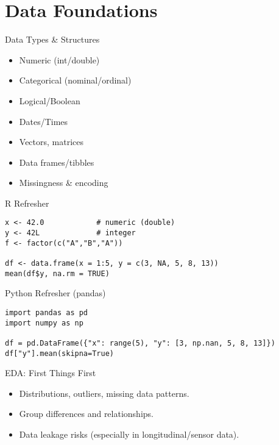 \documentclass[aspectratio=169]{beamer}
\begin{document}
\section{Data Foundations}

\begin{frame}{Data Types \& Structures}
\begin{multicols}{2}
\begin{itemize}
  \item Numeric (int/double)
  \item Categorical (nominal/ordinal)
  \item Logical/Boolean
  \item Dates/Times
\end{itemize}
\columnbreak
\begin{itemize}
  \item Vectors, matrices
  \item Data frames/tibbles
  \item Missingness \& encoding
\end{itemize}
\end{multicols}
\end{frame}

\begin{frame}[fragile]{R Refresher}
\begin{lstlisting}[style=rcode]
x <- 42.0            # numeric (double)
y <- 42L             # integer
f <- factor(c("A","B","A"))

df <- data.frame(x = 1:5, y = c(3, NA, 5, 8, 13))
mean(df$y, na.rm = TRUE)
\end{lstlisting}
\end{frame}

\begin{frame}[fragile]{Python Refresher (pandas)}
\begin{lstlisting}[style=pycode]
import pandas as pd
import numpy as np

df = pd.DataFrame({"x": range(5), "y": [3, np.nan, 5, 8, 13]})
df["y"].mean(skipna=True)
\end{lstlisting}
\end{frame}

\begin{frame}{EDA: First Things First}
\begin{itemize}
  \item Distributions, outliers, missing data patterns.
  \item Group differences and relationships.
  \item Data leakage risks (especially in longitudinal/sensor data).
\end{itemize}
\end{frame}
\end{document}
